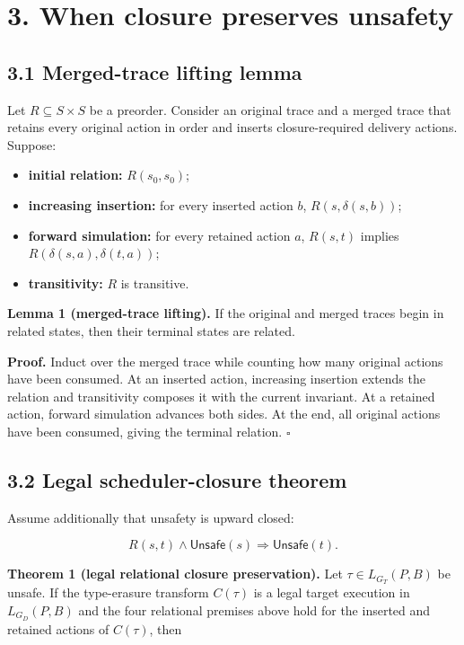 \section{3. When closure preserves
unsafety}\label{when-closure-preserves-unsafety}

\subsection{3.1 Merged-trace lifting
lemma}\label{merged-trace-lifting-lemma}

Let \(R\subseteq S\times S\) be a preorder. Consider an original trace
and a merged trace that retains every original action in order and
inserts closure-required delivery actions. Suppose:

\begin{itemize}
\tightlist
\item
  \textbf{initial relation:} \(R(s_0,s_0)\);
\item
  \textbf{increasing insertion:} for every inserted action \(b\),
  \(R(s,\delta(s,b))\);
\item
  \textbf{forward simulation:} for every retained action \(a\),
  \(R(s,t)\) implies \(R(\delta(s,a),\delta(t,a))\);
\item
  \textbf{transitivity:} \(R\) is transitive.
\end{itemize}

\textbf{Lemma 1 (merged-trace lifting).} If the original and merged
traces begin in related states, then their terminal states are related.

\textbf{Proof.} Induct over the merged trace while counting how many
original actions have been consumed. At an inserted action, increasing
insertion extends the relation and transitivity composes it with the
current invariant. At a retained action, forward simulation advances
both sides. At the end, all original actions have been consumed, giving
the terminal relation. \(\square\)

\subsection{3.2 Legal scheduler-closure
theorem}\label{legal-scheduler-closure-theorem}

Assume additionally that unsafety is upward closed:

\[
R(s,t)\land\mathsf{Unsafe}(s)\Rightarrow\mathsf{Unsafe}(t).
\]

\textbf{Theorem 1 (legal relational closure preservation).} Let
\(\tau\in L_{G_T}(P,B)\) be unsafe. If the type-erasure transform
\(C(\tau)\) is a legal target execution in \(L_{G_D}(P,B)\) and the four
relational premises above hold for the inserted and retained actions of
\(C(\tau)\), then

